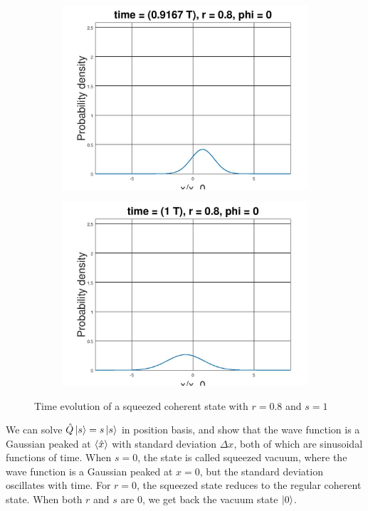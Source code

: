\documentclass[12pt, twoside]{article}
\begin{document}
\begin{figure}[h!]
\begin{subfigure}[h!]{0.3\linewidth}
	\end{subfigure}
	\begin{subfigure}[h!]{0.3\linewidth}
		\includegraphics[width=\linewidth]{graphs/squeeze_0.8/11.jpg}
	\end{subfigure}
	\begin{subfigure}[h!]{0.3\linewidth}
		\includegraphics[width=\linewidth]{graphs/squeeze_0.8/12.jpg}
	\end{subfigure}
	\caption{Time evolution of a squeezed coherent state with $r=0.8$ and $s=1$}
\end{figure}
We can solve $\hat{Q}\ket{s} = s\ket{s}$ in position basis, and show that the wave function is a Gaussian peaked at $\expval{\hat{x}}$ with standard deviation $\Delta x$, both of which are sinusoidal functions of time. When $s=0$, the state is called squeezed vacuum, where the wave function is a Gaussian peaked at $x=0$, but the standard deviation oscillates with time. For $r = 0$, the squeezed state reduces to the regular coherent state. When both $r$ and $s$ are $0$, we get back the vacuum state $\ket{0}$.
\end{document}
